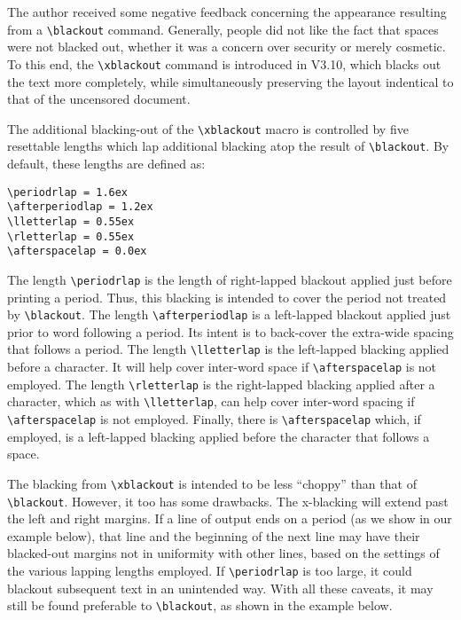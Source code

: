\documentclass{article}
\begin{document}
The author received some negative feedback concerning the appearance
resulting from a \verb|\blackout| command.  Generally, people did not
like the fact that spaces were not blacked out, whether it was a concern
over security or merely cosmetic.  To this end, the \verb|\xblackout|
command is introduced in V3.10, which blacks out the text more
completely, while simultaneously preserving the layout indentical to
that of the uncensored document.

The additional blacking-out of the \verb|\xblackout| macro is controlled
by five resettable lengths which lap additional blacking atop the
result of \verb|\blackout|.  By default, these lengths are defined as:

\verb|\periodrlap = 1.6ex|\\
\verb|\afterperiodlap = 1.2ex|\\
\verb|\lletterlap = 0.55ex|\\
\verb|\rletterlap = 0.55ex|\\
\verb|\afterspacelap = 0.0ex|

The length \verb|\periodrlap| is the length of right-lapped blackout
applied just before printing a period.  Thus, this blacking is intended
to cover the period not treated by \verb|\blackout|.  The length
\verb|\afterperiodlap| is a left-lapped blackout applied just prior to
word following a period.  Its intent is to back-cover the extra-wide
spacing that follows a period.  The length \verb|\lletterlap| is the
left-lapped blacking applied before a character.  It will help cover
inter-word space if \verb|\afterspacelap| is not employed.  The length
\verb|\rletterlap| is the right-lapped blacking applied after a
character, which as with \verb|\lletterlap|, can help cover inter-word
spacing if \verb|\afterspacelap| is not employed.  Finally, there is 
\verb|\afterspacelap| which, if employed, is a left-lapped blacking
applied before the character that follows a space.

The blacking from \verb|\xblackout| is intended to be less ``choppy''
than that of \verb|\blackout|.  However, it too has some drawbacks.  The
x-blacking will extend past the left and right margins.  If a line of
output ends on a period (as we show in our example below), that line and
the beginning of the next line may have their blacked-out margins not in
uniformity with other lines, based on the settings of the various
lapping lengths employed.  If \verb|\periodrlap| is too large, it could
blackout subsequent text in an unintended way.  With all these caveats,
it may still be found preferable to \verb|\blackout|, as shown in the
example below.
\end{document}
